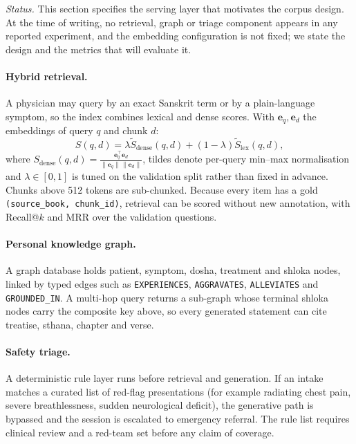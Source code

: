 \documentclass[10pt,twocolumn,letterpaper]{article}
\begin{document}
\noindent\textit{Status.} This section specifies the serving layer that
motivates the corpus design. At the time of writing, no retrieval, graph or
triage component appears in any reported experiment, and the embedding
configuration is not fixed; we state the design and the metrics that will
evaluate it.

\paragraph{Hybrid retrieval.}
A physician may query by an exact Sanskrit term or by a plain-language symptom,
so the index combines lexical and dense scores. With $\mathbf{e}_q, \mathbf{e}_d$
the embeddings of query $q$ and chunk $d$:
\begin{equation}
S(q, d) = \lambda \widetilde{S}_{\text{dense}}(q, d) + (1 - \lambda) \widetilde{S}_{\text{lex}}(q, d),
\end{equation}
where $S_{\text{dense}}(q, d) = \frac{\mathbf{e}_q^\top \mathbf{e}_d}{\|\mathbf{e}_q\| \|\mathbf{e}_d\|}$,
tildes denote per-query min--max normalisation and $\lambda \in [0, 1]$ is tuned on
the validation split rather than fixed in advance. Chunks above 512 tokens are
sub-chunked. Because every item has a gold \texttt{(source\_book, chunk\_id)},
retrieval can be scored without new annotation, with Recall@$k$ and MRR over the
validation questions.

\paragraph{Personal knowledge graph.}
A graph database holds patient, symptom, dosha, treatment and shloka nodes,
linked by typed edges such as \texttt{EXPERIENCES}, \texttt{AGGRAVATES},
\texttt{ALLEVIATES} and \texttt{GROUNDED\_IN}. A multi-hop query returns a
sub-graph whose terminal shloka nodes carry the composite key above, so every
generated statement can cite treatise, sthana, chapter and verse.

\paragraph{Safety triage.}
A deterministic rule layer runs before retrieval and generation. If an intake
matches a curated list of red-flag presentations (for example radiating chest
pain, severe breathlessness, sudden neurological deficit), the generative path
is bypassed and the session is escalated to emergency referral. The rule list
requires clinical review and a red-team set before any claim of coverage.
\end{document}
